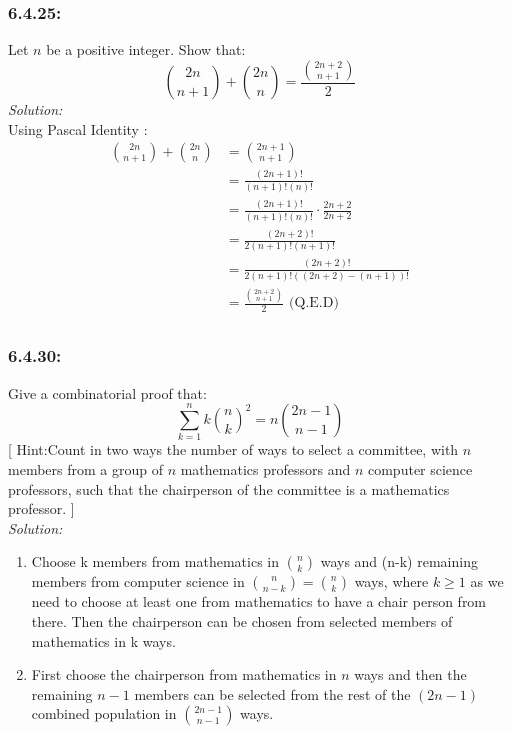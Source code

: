 \documentclass[a4paper]{article}
\begin{document}
\subsubsection*{6.4.25:} Let $n$ be a positive integer. Show that: 
\begin{equation*}
	{{2n} \choose {n+1}} + {{2n} \choose {n}} = \frac{{{2n+2} \choose {n+1}}}{2}
\end{equation*}
\textit{Solution:} \\
Using Pascal Identity :
\begin{align*}
	{{2n} \choose {n+1}} + {{2n} \choose {n}} & = {{2n+1} \choose {n+1}}                             \\
	                                          & = \frac{(2n+1)!}{(n+1)!(n)!}                         \\
	                                          & = \frac{(2n+1)!}{(n+1)!(n)!} \cdot \frac{2n+2}{2n+2} \\
	                                          & = \frac{(2n+2)!}{2(n+1)!(n+1)!}                      \\
	                                          & = \frac{(2n+2)!}{2(n+1)!((2n+2)-(n+1))!}             \\
	                                          & = \frac{{{2n+2} \choose {n+1}}}{2} \text{ (Q.E.D)}   \\
\end{align*}

\subsubsection*{6.4.30:}
Give a combinatorial proof that:
\begin{equation*}
	\sum_{k=1}^{n} k{n \choose k}^{2} = n{{2n-1}\choose{n-1}}
\end{equation*}
[ Hint:Count in two ways the number of ways to select a committee, with $n$ members from a group of $n$ mathematics professors and $n$ computer science professors, such that the chairperson of the committee is a mathematics professor. ]\\
\textit{Solution:} \\
\begin{enumerate}
	\item Choose k members from mathematics in ${n \choose k}$ ways and (n-k) remaining members from computer science in ${n\choose{n-k}} = {n \choose k}$ ways, where $k \geq 1$ as we need to choose at least one from mathematics to have a chair person from there. Then the chairperson can be chosen from selected members of mathematics in k ways.
	\item First choose the chairperson from mathematics in $n$ ways and then the remaining $n-1$ members can be selected from the rest of the $(2n -1)$ combined population in ${{2n-1}\choose{n-1}}$ ways.
\end{enumerate}
\newpage
{}
\end{document}
